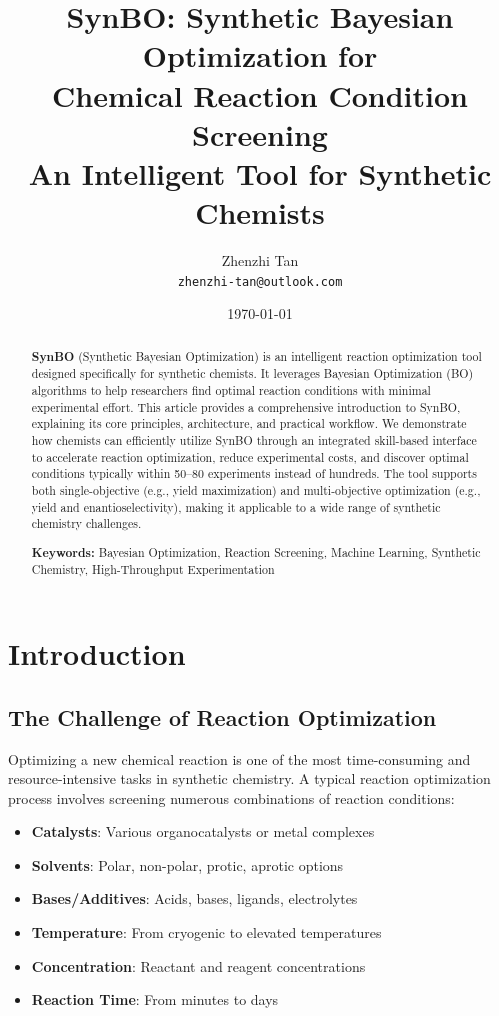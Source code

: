 \documentclass[12pt,a4paper]{article}
\title{\textbf{\Large SynBO: Synthetic Bayesian Optimization for\\ Chemical Reaction Condition Screening}\\[1em]
\large An Intelligent Tool for Synthetic Chemists}
\author{Zhenzhi Tan\\[0.5em]
\texttt{zhenzhi-tan@outlook.com}}
\date{\today}
\begin{document}
\maketitle

\begin{abstract}
\noindent
\textbf{SynBO} (Synthetic Bayesian Optimization) is an intelligent reaction optimization tool designed specifically for synthetic chemists. It leverages Bayesian Optimization (BO) algorithms to help researchers find optimal reaction conditions with minimal experimental effort. This article provides a comprehensive introduction to SynBO, explaining its core principles, architecture, and practical workflow. We demonstrate how chemists can efficiently utilize SynBO through an integrated skill-based interface to accelerate reaction optimization, reduce experimental costs, and discover optimal conditions typically within 50--80 experiments instead of hundreds. The tool supports both single-objective (e.g., yield maximization) and multi-objective optimization (e.g., yield and enantioselectivity), making it applicable to a wide range of synthetic chemistry challenges.

\vspace{1em}
\noindent\textbf{Keywords:} Bayesian Optimization, Reaction Screening, Machine Learning, Synthetic Chemistry, High-Throughput Experimentation
\end{abstract}

\tableofcontents
\newpage

\section{Introduction}

\subsection{The Challenge of Reaction Optimization}

Optimizing a new chemical reaction is one of the most time-consuming and resource-intensive tasks in synthetic chemistry. A typical reaction optimization process involves screening numerous combinations of reaction conditions:

\begin{itemize}
    \item \textbf{Catalysts}: Various organocatalysts or metal complexes
    \item \textbf{Solvents}: Polar, non-polar, protic, aprotic options
    \item \textbf{Bases/Additives}: Acids, bases, ligands, electrolytes
    \item \textbf{Temperature}: From cryogenic to elevated temperatures
    \item \textbf{Concentration}: Reactant and reagent concentrations
    \item \textbf{Reaction Time}: From minutes to days
\end{itemize}
\end{document}
